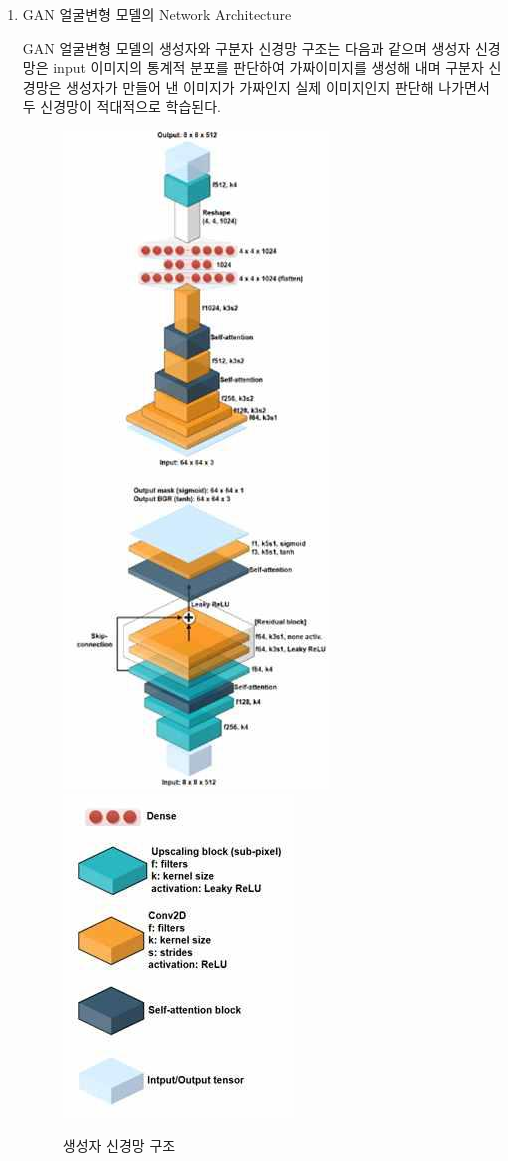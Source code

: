 \documentclass[chapter,oneside]{oblivoir}
\begin{document}
\begin{enumerate}
    \item GAN 얼굴변형 모델의 Network Architecture

    GAN 얼굴변형 모델의 생성자와 구분자 신경망 구조는 다음과 같으며 생성자 신경망은 input 이미지의 통계적 분포를 판단하여 가짜이미지를 생성해 내며 구분자 신경망은 생성자가 만들어 낸 이미지가 가짜인지 실제 이미지인지 판단해 나가면서 두 신경망이 적대적으로 학습된다.
    \begin{figure}[h!]
    \centering
    \includegraphics{pic/chp5/img896}
    \includegraphics{pic/chp5/img897}
    \caption{생성자 신경망 구조 \cite{reference11}}
    \end{figure}


\end{enumerate}
\end{document}
